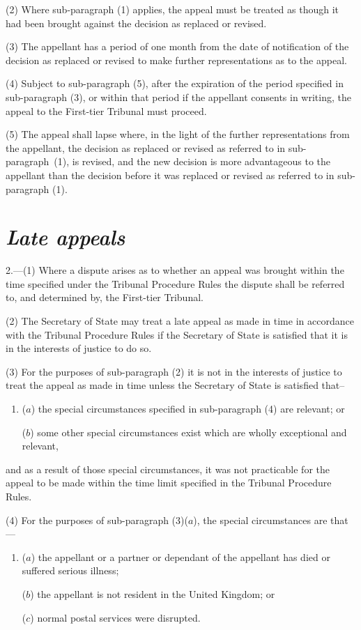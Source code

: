 \documentclass[12pt,a4paper]{article}
\begin{document}
(2) Where sub-paragraph (1) applies, the appeal must be treated as though it had been brought against the decision as replaced or revised.

(3) The appellant has a period of one month from the date of notification of the decision as replaced or revised to make further representations as to the appeal.

(4) Subject to sub-paragraph (5), after the expiration of the period specified in sub-paragraph (3), or within that period if the appellant consents in writing, the appeal to the First-tier Tribunal must proceed.

(5) The appeal shall lapse where, in the light of the further representations from the appellant, the decision as replaced or revised as referred to in sub-paragraph~(1), is revised, and the new decision is more advantageous to the appellant than the decision before it was replaced or revised as referred to in sub-paragraph (1).

\section*{\itshape Late appeals}

2.---(1)  Where a dispute arises as to whether an appeal was brought within the time specified under the Tribunal Procedure Rules the dispute shall be referred to, and determined by, the First-tier Tribunal.

(2) The Secretary of State may treat a late appeal as made in time in accordance with the Tribunal Procedure Rules if the Secretary of State is satisfied that it is in the interests of justice to do so.

(3) For the purposes of sub-paragraph (2) it is not in the interests of justice to treat the appeal as made in time unless the Secretary of State is satisfied that–
\begin{enumerate}\item[]
($a$) the special circumstances specified in sub-paragraph (4) are relevant; or

($b$) some other special circumstances exist which are wholly exceptional and relevant,
\end{enumerate}
and as a result of those special circumstances, it was not practicable for the appeal to be made within the time limit specified in the Tribunal Procedure Rules.

(4) For the purposes of sub-paragraph (3)($a$), the special circumstances are that—
\begin{enumerate}\item[]
($a$) the appellant or a partner or dependant of the appellant has died or suffered serious illness;

($b$) the appellant is not resident in the United Kingdom; or

($c$) normal postal services were disrupted.
\end{enumerate}
\end{document}
